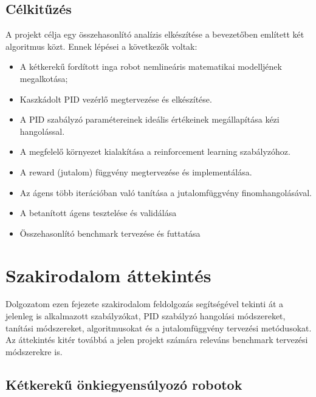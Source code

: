 \documentclass[12pt,a4paper]{report}
\begin{document}
	\section{Célkitűzés}
	A projekt célja egy összehasonlító analízis elkészítése a bevezetőben említett két algoritmus közt. Ennek lépései a következők voltak:
	\begin{itemize}
		\item A kétkerekű fordított inga robot nemlineáris matematikai modelljének megalkotása;
		\item Kaszkádolt PID vezérlő megtervezése és elkészítése.
		\item A PID szabályzó paramétereinek ideális értékeinek megállapítása kézi hangolással.
		\item A megfelelő környezet kialakítása a reinforcement learning szabályzóhoz.
		\item A reward (jutalom) függvény megtervezése és implementálása.
		\item Az ágens több iterációban való tanítása a jutalomfüggvény finomhangolásával.
		\item A betanított ágens tesztelése és validálása
		\item Összehasonlító benchmark tervezése és futtatása
	\end{itemize}
	
	\chapter{Szakirodalom áttekintés}
	Dolgozatom ezen fejezete szakirodalom feldolgozás segítségével tekinti át a jelenleg is alkalmazott szabályzókat, PID szabályzó hangolási módszereket, tanítási módszereket, algoritmusokat és a jutalomfüggvény tervezési metódusokat. Az áttekintés kitér továbbá a jelen projekt számára releváns benchmark tervezési módszerekre is.
	
	\section{Kétkerekű önkiegyensúlyozó robotok}
\end{document}
